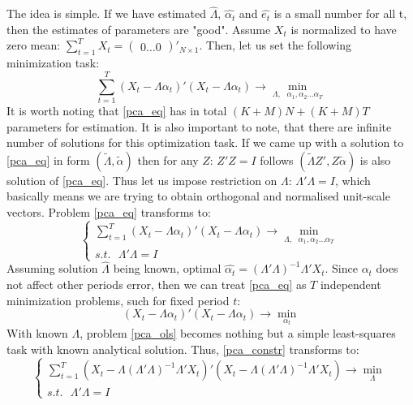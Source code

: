 \documentclass[a4paper, 14pt]{article}
\begin{document}
The idea is simple. If we have estimated  $\hat{\Lambda}$, $\hat{\alpha_t}$ and $\hat{e_t}$ is a small number for all t, then the estimates of parameters are "good". Assume $X_t$ is normalized to have zero mean: $\sum_{t=1}^{T} X_t = \begin{pmatrix} 
0 \dots 0
\end{pmatrix}'_{N \times 1}$. \noindent Then, let us set the following minimization task: 
\begin{equation}\label{pca_eq}
\sum_{t=1}^{T} (X_t - \Lambda \alpha_t)'(X_t - \Lambda \alpha_t) \rightarrow \min_{\Lambda,\text{ } \alpha_1, \alpha_2 \dotsc \alpha_T} 
\end{equation}
It is worth noting that \eqref{pca_eq} has in total $(K+M)  N+ (K+M) T$  parameters for estimation. It is also important to note, that there are infinite number of solutions for this optimization task. If we came up with a solution to \eqref{pca_eq} in form $(\tilde{\Lambda}, \widetilde{\alpha})$ then for any $Z$: $Z'Z=I$ follows $(\tilde{\Lambda} Z',Z\widetilde{\alpha})$ is also solution of \eqref{pca_eq}. Thus let us impose restriction on $\Lambda$: $\Lambda'\Lambda = I$, which basically means we are trying to obtain orthogonal  and normalised unit-scale vectors. Problem \eqref{pca_eq} transforms to: 
\begin{equation}\label{pca_constr}
	\begin{cases}
		\sum_{t=1}^{T} (X_t - \Lambda \alpha_t)'(X_t - \Lambda \alpha_t) \rightarrow \min_{\Lambda,\text{ } \alpha_1, \alpha_2 \dotsc \alpha_T} \\
		s.t. \text{ } \Lambda'\Lambda = I
	\end{cases}
\end{equation}
Assuming solution $\hat{\Lambda}$ being known, optimal $\hat{\alpha_t} = (\Lambda' \Lambda)^{-1}\Lambda'X_t$. Since $\alpha_t$ does not affect other periods error, then we  can treat \eqref{pca_eq} as $T$ independent minimization problems, such for fixed period $t$: 
\begin{equation} \label{pca_ols}
(X_t - \Lambda \alpha_t)'(X_t - \Lambda \alpha_t) \rightarrow \min_{ \alpha_t}
\end{equation}
With known $\Lambda$, problem \eqref{pca_ols} becomes nothing but a simple least-squares task with known analytical solution. Thus, \eqref{pca_constr} transforms to:
\begin{equation}
	\begin{cases}
	\sum_{t=1}^{T} (X_t - \Lambda (\Lambda' \Lambda)^{-1}\Lambda'X_t)'(X_t - \Lambda (\Lambda' \Lambda)^{-1}\Lambda'X_t) \rightarrow \min_{\Lambda} \\
	s.t. \text{ } \Lambda'\Lambda = I
	\end{cases}
\end{equation}
\end{document}
